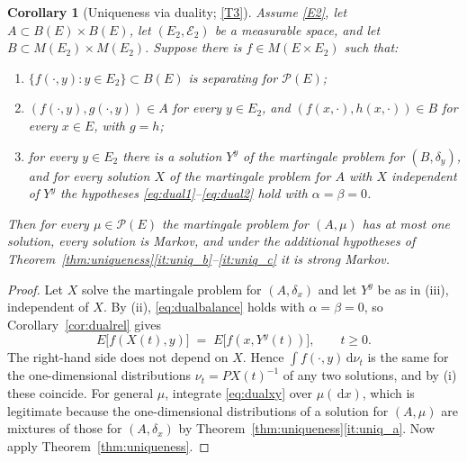 \documentclass[11pt,a4paper]{article}
\theoremstyle{plain}
\newtheorem{corollary}[theorem]{Corollary}
\theoremstyle{definition}
\theoremstyle{remark}
\newcommand{\Meas}{M}                          %
\newcommand{\Bdd}{B}                           %
\newcommand{\Prob}{\mathcal{P}}                %
\newcommand{\dif}{\,\mathrm{d}}
\begin{document}
\begin{corollary}[Uniqueness via duality; \eqref{T3}]
  \label{cor:uniqviadual}
  Assume \eqref{E2}, let $A \subset \Bdd(E) \times \Bdd(E)$, let $(E_2,\mathcal{E}_2)$ be
  a measurable space, and let $B \subset \Meas(E_2) \times \Meas(E_2)$.  Suppose
  there is $f \in \Meas(E \times E_2)$ such that:
  \begin{enumerate}[label=(\roman*)]
  \item $\{ f(\cdot,y) : y \in E_2 \} \subset \Bdd(E)$ is separating for
    $\Prob(E)$;
  \item $(f(\cdot,y), g(\cdot,y)) \in A$ for every $y \in E_2$, and
    $(f(x,\cdot), h(x,\cdot)) \in B$ for every $x \in E$, with $g = h$;
  \item for every $y \in E_2$ there is a solution $Y^y$ of the martingale problem
    for $(B, \delta_y)$, and for every solution $X$ of the martingale problem for
    $A$ with $X$ independent of $Y^y$ the hypotheses
    \eqref{eq:dual1}--\eqref{eq:dual2} hold with $\alpha = \beta = 0$.
  \end{enumerate}
  Then for every $\mu \in \Prob(E)$ the martingale problem for $(A,\mu)$ has at
  most one solution, every solution is Markov, and under the additional
  hypotheses of Theorem~\ref{thm:uniqueness}\ref{it:uniq_b}--\ref{it:uniq_c} it
  is strong Markov.
\end{corollary}

\begin{proof}
  Let $X$ solve the martingale problem for $(A,\delta_x)$ and let $Y^y$ be as in
  (iii), independent of $X$.  By (ii), \eqref{eq:dualbalance} holds with
  $\alpha = \beta = 0$, so Corollary~\ref{cor:dualrel} gives
  \begin{equation}
    \label{eq:dualxy}
    E\bigl[ f(X(t), y) \bigr] \;=\; E\bigl[ f(x, Y^y(t)) \bigr] ,
    \qquad t \geq 0 .
  \end{equation}
  The right-hand side does not depend on $X$.  Hence $\int f(\cdot,y) \dif \nu_t$
  is the same for the one-dimensional distributions $\nu_t = P X(t)^{-1}$ of any
  two solutions, and by (i) these coincide.  For general $\mu$, integrate
  \eqref{eq:dualxy} over $\mu(\dif x)$, which is legitimate because the
  one-dimensional distributions of a solution for $(A,\mu)$ are mixtures of those
  for $(A,\delta_x)$ by Theorem~\ref{thm:uniqueness}\ref{it:uniq_a}.  Now apply
  Theorem~\ref{thm:uniqueness}.
\end{proof}
\end{document}
